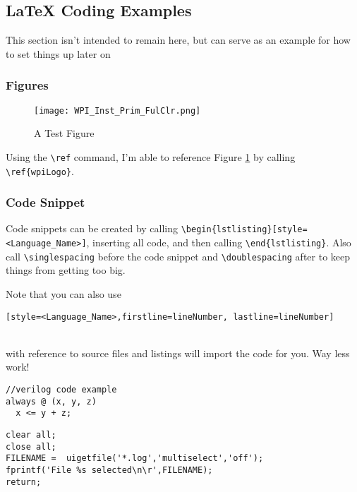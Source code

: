 \newpage
\subsection{LaTeX Coding Examples}
This section isn't intended to remain here, but can serve as an example for how to set things up later on

\subsubsection{Figures} 
\begin{figure}[H]
	\centerline{\texttt{[image: WPI\_Inst\_Prim\_FulClr.png]}}
	\caption{A Test Figure}
	\label{wpiLogo}
\end{figure}

Using the \verb!\ref! command, I'm able to reference Figure \ref{wpiLogo} by calling \verb!\ref{wpiLogo}!.

\subsubsection{Code Snippet}
Code snippets can be created by calling \verb!\begin{lstlisting}[style=<Language_Name>]!, inserting all code, and then calling \verb!\end{lstlisting}!. Also call \verb!\singlespacing! before the code snippet and \verb!\doublespacing! after to keep things from getting too big.
\par
Note that you can also use \\\begin{footnotesize} \verb![style=<Language_Name>,firstline=lineNumber, lastline=lineNumber]!\end{footnotesize} \\ with reference to source files and listings will import the code for you. Way less work!

\singlespacing %
\begin{lstlisting}[style=Verilog]
//verilog code example
always @ (x, y, z)
  x <= y + z;
\end{lstlisting}
\doublespacing %

\singlespacing %
\begin{lstlisting}[style=Matlab]
%Matlab code example
clear all;
close all;
FILENAME =  uigetfile('*.log','multiselect','off');
fprintf('File %s selected\n\r',FILENAME);
return;
\end{lstlisting}
\doublespacing %

